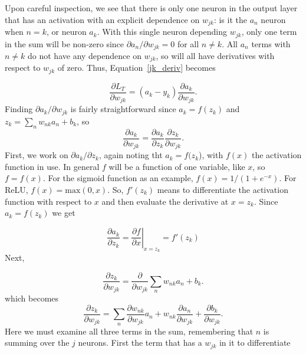 \documentclass[12pt]{article}
\begin{document}
Upon careful inspection, we see that there is only one neuron in the output layer that has an activation with an explicit dependence on $w_{jk}$: is it the $a_n$ neuron when $n=k$, or neuron $a_k$. With this single neuron depending $w_{jk}$, only one term in the sum will be non-zero since $\partial a_n/\partial w_{jk}=0$ for all $n\ne k$. All $a_n$ terms with $n\ne k$ do not have any dependence on $w_{jk}$, so will all have derivatives with respect to $w_{jk}$ of zero. Thus, Equation~\ref{jk_deriv} becomes

\begin{equation}
\frac{\partial L_T}{\partial w_{jk}} = (a_k-y_k)\frac{\partial a_k}{\partial w_{jk}}.
\label{jk_deriv1}
\end{equation}
Finding $\partial a_k/\partial w_{jk}$ is fairly straightforward since $a_k=f(z_k)$ and $z_k=\sum_n w_{nk} a_n+b_k$, so
\begin{equation}
\frac{\partial a_k}{\partial w_{jk}} = \frac{\partial a_k}{\partial z_k}\frac{\partial z_k}{\partial w_{jk}}.
\end{equation}
First, we work on $\partial a_k/\partial z_k$, again noting tht $a_k=f(z_k$), with $f(x)$ the activation function in use. In general $f$ will be a function of one variable, like $x$, so $f=f(x)$. For the sigmoid function as an example, $f(x)=1/(1+e^{-x})$. For ReLU, $f(x)=\textrm{max}(0,x)$. So, $f'(z_k)$ means to differentiate the activation function with respect to $x$ and then evaluate the derivative at $x=z_k$. Since $a_k=f(z_k)$ we get

\begin{equation}
\frac{\partial a_k}{\partial z_k} = \left . \frac{\partial f}{\partial x} \right\vert_{x=z_k} = f'(z_k)
\end{equation}
Next,

\begin{equation}
\frac{\partial z_k}{\partial w_{jk}} = \frac{\partial}{\partial w_{jk}} \sum_n w_{nk} a_n + b_k.
\end{equation} 
which becomes
\begin{equation}
\frac{\partial z_k}{\partial w_{jk}} = \sum_n \frac{\partial w_{nk}}{\partial w_{jk}} a_n + w_{nk} \frac{\partial a_n}{\partial w_{jk}}+ \frac{\partial b_k}{\partial w_{jk}}.
\label{dz_k_wjk}
\end{equation} 
Here we must examine all three terms in the sum, remembering that $n$ is summing over the $j$ neurons. First the term that has a $w_{jk}$ in it to differentiate 
\end{document}
